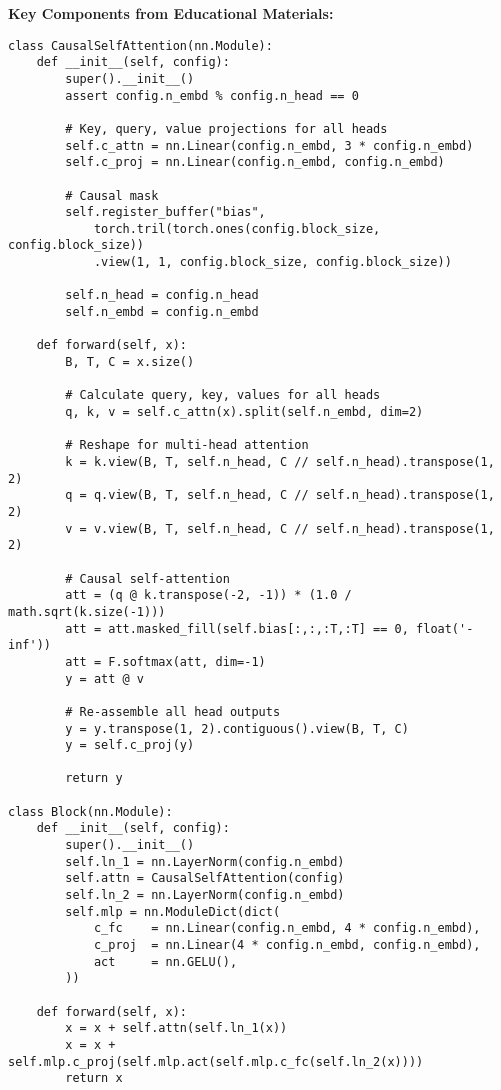 \documentclass[11pt,a4paper]{book}
\begin{document}
\textbf{Key Components from Educational Materials:}
\begin{verbatim}
class CausalSelfAttention(nn.Module):
    def __init__(self, config):
        super().__init__()
        assert config.n_embd % config.n_head == 0
        
        # Key, query, value projections for all heads
        self.c_attn = nn.Linear(config.n_embd, 3 * config.n_embd)
        self.c_proj = nn.Linear(config.n_embd, config.n_embd)
        
        # Causal mask
        self.register_buffer("bias", 
            torch.tril(torch.ones(config.block_size, config.block_size))
            .view(1, 1, config.block_size, config.block_size))
        
        self.n_head = config.n_head
        self.n_embd = config.n_embd

    def forward(self, x):
        B, T, C = x.size()
        
        # Calculate query, key, values for all heads
        q, k, v = self.c_attn(x).split(self.n_embd, dim=2)
        
        # Reshape for multi-head attention
        k = k.view(B, T, self.n_head, C // self.n_head).transpose(1, 2)
        q = q.view(B, T, self.n_head, C // self.n_head).transpose(1, 2)
        v = v.view(B, T, self.n_head, C // self.n_head).transpose(1, 2)

        # Causal self-attention
        att = (q @ k.transpose(-2, -1)) * (1.0 / math.sqrt(k.size(-1)))
        att = att.masked_fill(self.bias[:,:,:T,:T] == 0, float('-inf'))
        att = F.softmax(att, dim=-1)
        y = att @ v
        
        # Re-assemble all head outputs
        y = y.transpose(1, 2).contiguous().view(B, T, C)
        y = self.c_proj(y)
        
        return y

class Block(nn.Module):
    def __init__(self, config):
        super().__init__()
        self.ln_1 = nn.LayerNorm(config.n_embd)
        self.attn = CausalSelfAttention(config)
        self.ln_2 = nn.LayerNorm(config.n_embd)
        self.mlp = nn.ModuleDict(dict(
            c_fc    = nn.Linear(config.n_embd, 4 * config.n_embd),
            c_proj  = nn.Linear(4 * config.n_embd, config.n_embd),
            act     = nn.GELU(),
        ))

    def forward(self, x):
        x = x + self.attn(self.ln_1(x))
        x = x + self.mlp.c_proj(self.mlp.act(self.mlp.c_fc(self.ln_2(x))))
        return x
\end{verbatim}
\end{document}
